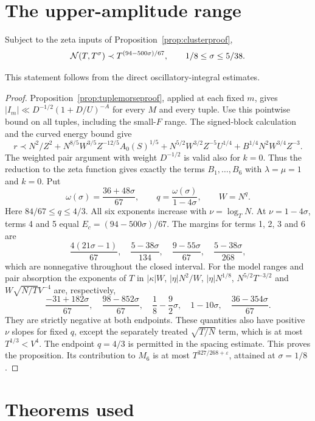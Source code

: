 \section{The upper-amplitude range}
\label{app:upperproof}

\begin{proposition}\label{prop:curvatureline}
Subject to the zeta inputs of Proposition~\ref{prop:clusterproof},
\[
 \mathcal{N}(T,T^\sigma)\prec T^{(94-500\sigma)/67},
 \qquad 1/8\le\sigma\le5/38.
\]
\end{proposition}
This statement follows from the direct oscillatory-integral estimates.
\begin{proof}
Proposition~\ref{prop:tuplemorseproof}, applied at each fixed $m$, gives
$|I_m|\ll D^{-1/2}(1+D/U)^{-A}$ for every $M$ and every tuple.
Use this pointwise bound on all tuples, including the small-$F$ range. The signed-block calculation and the curved energy bound give
\[
 r\prec N^2/Z^2+N^{8/5}W^{3/5}Z^{-12/5}A_0(S)^{1/5}
 +N^{5/2}W^{3/2}Z^{-5}U^{1/4}
 +B^{1/4}N^2W^{3/4}Z^{-3}.
\]
The weighted pair argument with weight $D^{-1/2}$ is valid also for
$k=0$. Thus the reduction to the zeta function gives exactly the terms
$B_1,\ldots,B_6$ with
$\lambda=\mu=1$ and $k=0$. Put
\[
 \omega(\sigma)=\frac{36+48\sigma}{67},\qquad
 q=\frac{\omega(\sigma)}{1-4\sigma},\qquad W=N^q.
\]
Here $84/67\le q\le4/3$. All six exponents increase with
$\nu=\log_TN$. At $\nu=1-4\sigma$, terms 4 and 5 equal
$E_c=(94-500\sigma)/67$. The margins for terms 1, 2, 3 and 6 are
\[
 \frac{4(21\sigma-1)}{67},\quad
 \frac{5-38\sigma}{134},\quad
 \frac{9-55\sigma}{67},\quad
 \frac{5-38\sigma}{268},
\]
which are nonnegative throughout the closed interval.
For the model ranges and pair absorption the exponents of $T$ in
$|\kappa|W$, $|\eta|N^2/W$, $|\eta|N^{1/8}$,
$N^{5/2}T^{-3/2}$ and $W\sqrt{N/T}V^{-4}$ are, respectively,
\[
 \frac{-31+182\sigma}{67},\quad
 \frac{98-852\sigma}{67},\quad
 \frac18-\frac92\sigma,\quad
 1-10\sigma,\quad
 \frac{36-354\sigma}{67}.
\]
They are strictly negative at both endpoints. These quantities also
have positive $\nu$ slopes for fixed $q$, except the separately treated
$\sqrt{T/N}$ term, which is at most $T^{1/3}<V^4$.
The endpoint $q=4/3$ is permitted in the spacing estimate.
This proves the proposition. Its contribution to $M_6$ is at most
$T^{327/268+\varepsilon}$, attained at $\sigma=1/8$.
\end{proof}



\section{Theorems used}\label{app:base}

